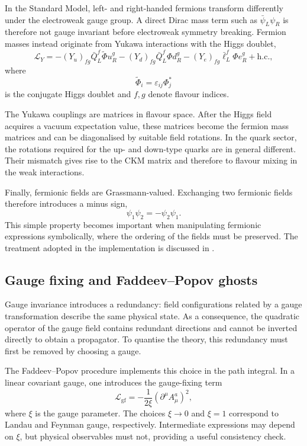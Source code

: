 In the Standard Model, left- and right-handed fermions transform differently
under the electroweak gauge group. A direct Dirac mass term such as
$\bar\psi_L\psi_R$ is therefore not gauge invariant before electroweak
symmetry breaking. Fermion masses instead originate from Yukawa interactions
with the Higgs doublet,
\begin{equation}
    \mathcal{L}_Y =
    -(Y_u)_{fg}\bar Q_L^f\tilde\Phi u_R^g
    -(Y_d)_{fg}\bar Q_L^f\Phi d_R^g
    -(Y_e)_{fg}\bar\ell_L^f\Phi e_R^g
    +\text{h.c.},
\label{eq:theory-yukawa}
\end{equation}
where
\begin{equation}
\tilde\Phi_i=\varepsilon_{ij}\Phi_j^*
\end{equation}
is the conjugate Higgs doublet and $f,g$ denote flavour indices.

The Yukawa couplings are matrices in flavour space. After the Higgs field
acquires a vacuum expectation value, these matrices become the fermion mass
matrices and can be diagonalised by suitable field rotations. In the quark
sector, the rotations required for the up- and down-type quarks are in
general different. Their mismatch gives rise to the CKM matrix and therefore
to flavour mixing in the weak interactions.


Finally, fermionic fields are Grassmann-valued. Exchanging two fermionic
fields therefore introduces a minus sign,
\begin{equation}
\psi_1\psi_2=-\psi_2\psi_1 .
\end{equation}
This simple property becomes important when manipulating fermionic
expressions symbolically, where the ordering of the fields must be preserved.
The treatment adopted in the implementation is discussed in
.

\subsection{Gauge fixing and Faddeev--Popov ghosts}
\label{sec:theory-gaugefixing}

Gauge invariance introduces a redundancy: field configurations related by a gauge transformation describe the same physical state. As a consequence, the quadratic operator of the gauge field contains redundant directions and cannot be inverted directly to obtain a propagator. To quantise the theory, this redundancy must first be removed by choosing a gauge.

The Faddeev--Popov procedure implements this choice in the path integral. In a linear covariant gauge, one introduces the gauge-fixing term
\begin{equation}
    \mathcal{L}_{\mathrm{gf}}
    =
    -\frac{1}{2\xi}
    \left(\partial^\mu A^a_\mu\right)^2 ,
\label{eq:theory-gf}
\end{equation}
where $\xi$ is the gauge parameter. The choices $\xi\to0$ and $\xi=1$ correspond to Landau and Feynman gauge, respectively. Intermediate expressions may depend on $\xi$, but physical observables must not, providing a useful consistency check.

